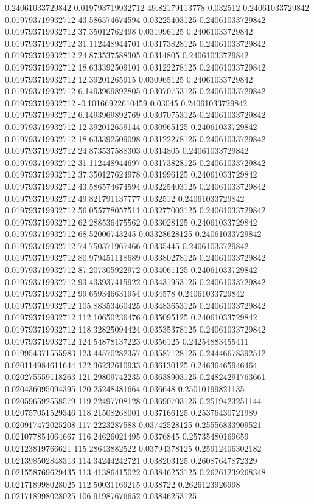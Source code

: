 0.24061033729842 0.019793719932712 49.82179113778 0.032512
0.24061033729842 0.019793719932712 43.586574674594 0.03225403125
0.24061033729842 0.019793719932712 37.35012762498 0.031996125
0.24061033729842 0.019793719932712 31.112448944701 0.03173828125
0.24061033729842 0.019793719932712 24.873537588305 0.0314805
0.24061033729842 0.019793719932712 18.633392509101 0.03122278125
0.24061033729842 0.019793719932712 12.39201265915 0.030965125
0.24061033729842 0.019793719932712 6.1493969892805 0.03070753125
0.24061033729842 0.019793719932712 -0.10166922610459 0.03045
0.24061033729842 0.019793719932712 6.1493969892769 0.03070753125
0.24061033729842 0.019793719932712 12.392012659144 0.030965125
0.24061033729842 0.019793719932712 18.633392509098 0.03122278125
0.24061033729842 0.019793719932712 24.873537588303 0.0314805
0.24061033729842 0.019793719932712 31.112448944697 0.03173828125
0.24061033729842 0.019793719932712 37.350127624978 0.031996125
0.24061033729842 0.019793719932712 43.586574674594 0.03225403125
0.24061033729842 0.019793719932712 49.821791137777 0.032512
0.24061033729842 0.019793719932712 56.055778057511 0.03277003125
0.24061033729842 0.019793719932712 62.288536475562 0.033028125
0.24061033729842 0.019793719932712 68.52006743245 0.03328628125
0.24061033729842 0.019793719932712 74.750371967466 0.0335445
0.24061033729842 0.019793719932712 80.979451118689 0.03380278125
0.24061033729842 0.019793719932712 87.207305922972 0.034061125
0.24061033729842 0.019793719932712 93.433937415922 0.03431953125
0.24061033729842 0.019793719932712 99.659346631954 0.034578
0.24061033729842 0.019793719932712 105.88353460425 0.03483653125
0.24061033729842 0.019793719932712 112.10650236476 0.035095125
0.24061033729842 0.019793719932712 118.32825094424 0.03535378125
0.24061033729842 0.019793719932712 124.54878137223 0.0356125
0.24254883455411 0.019954371555983 123.44570282357 0.03587128125
0.24446678392512 0.020114984611644 122.36232610933 0.036130125
0.24636465946464 0.020275559118263 121.29809742235 0.03638903125
0.24824291763661 0.020436095094395 120.25248481664 0.036648
0.25010199821135 0.020596592558579 119.22497708128 0.03690703125
0.2519423251144 0.020757051529346 118.21508268001 0.037166125
0.25376430721989 0.020917472025208 117.2223287588 0.03742528125
0.25556833909521 0.021077854064667 116.24626021495 0.0376845
0.25735480169659 0.02123819766621 115.28643882522 0.03794378125
0.25912406302182 0.021398502848313 114.34244242721 0.038203125
0.26087647872329 0.021558769629435 113.41386415022 0.03846253125
0.26261239268348 0.021718998028025 112.50031169215 0.038722
0.2626123926998 0.021718998028025 106.91987676652 0.03846253125
